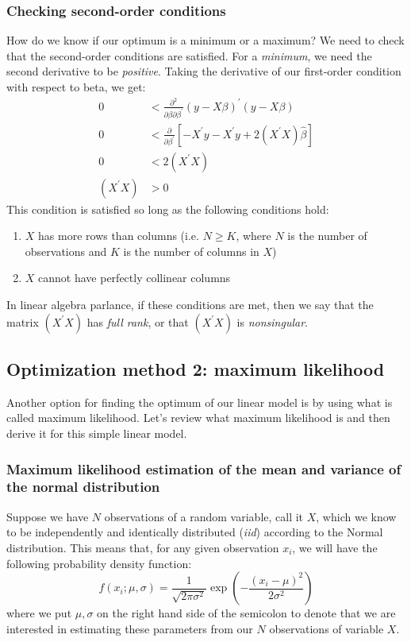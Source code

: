 \documentclass[12pt,english]{article}
\begin{document}
\subsubsection{Checking second-order conditions}

How do we know if our optimum is a minimum or a maximum? We need to check that the second-order conditions are satisfied. For a \emph{minimum}, we need the second derivative to be \emph{positive}. Taking the derivative of our first-order condition with respect to beta, we get:
\begin{align}
0 & <\frac{\partial^{2}}{\partial\beta\partial\beta^{\prime}}\left(y-X\beta\right)^{\prime}\left(y-X\beta\right)\label{eq:5}\\
0 & <\frac{\partial}{\partial\beta^{\prime}}\left[-X^{\prime}y-X^{\prime}y+2\left(X^{\prime}X\right)\hat{\beta}\right]\nonumber \\
0 & <2\left(X^{\prime}X\right)\nonumber \\
\left(X^{\prime}X\right) & >0\nonumber 
\end{align}
This condition is satisfied so long as the following conditions hold:
\begin{enumerate}
\item $X$ has more rows than columns (i.e. $N\geq K$, where $N$ is the number of observations and $K$ is the number of columns in $X$)
\item $X$ cannot have perfectly collinear columns
\end{enumerate}
In linear algebra parlance, if these conditions are met, then we say that the matrix $\left(X^{\prime}X\right)$ has \emph{full rank},
or that $\left(X^{\prime}X\right)$ is \emph{nonsingular}.

\subsection{Optimization method 2: maximum likelihood}

Another option for finding the optimum of our linear model is by using what is called maximum likelihood. Let's review what maximum likelihood is and then derive it for this simple linear model.

\subsubsection{Maximum likelihood estimation of the mean and variance of the normal distribution}

Suppose we have $N$ observations of a random variable, call it $X$, which we know to be independently and identically distributed (\emph{iid}) according to the Normal distribution. This means that, for any given observation $x_{i}$, we will have the following probability density function:
\begin{equation}
f\left(x_{i};\mu,\sigma\right)=\frac{1}{\sqrt{2\pi\sigma^{2}}}\exp\left(-\frac{\left(x_{i}-\mu\right)^{2}}{2\sigma^{2}}\right)\label{eq:6}
\end{equation}
where we put $\mu,\sigma$ on the right hand side of the semicolon to denote that we are interested in estimating these parameters from our $N$ observations of variable $X$.
\end{document}
